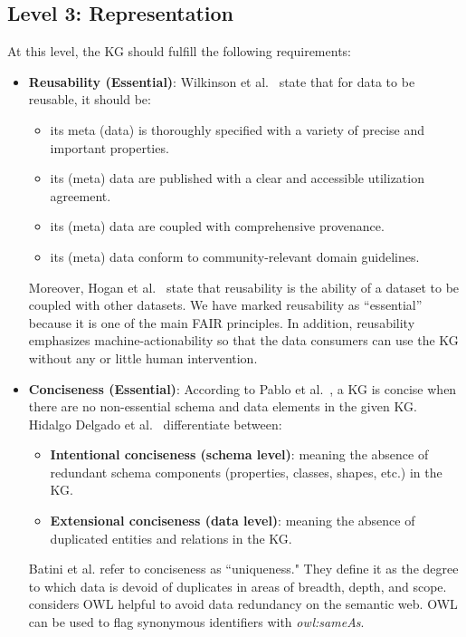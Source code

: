 \documentclass[runningheads]{llncs}
\begin{document}
\subsection{Level 3: Representation}
At this level, the KG should fulfill the following requirements:
\begin{itemize}
\item \textbf {Reusability (Essential)}:
\label{subsec:reusability}
Wilkinson et al.~\cite{Wilkinson2016} state that for data to be reusable, it should be:
\begin{itemize}
\item its meta (data) is thoroughly specified with a variety of precise and important properties.
\item its (meta) data are published with a clear and accessible utilization agreement.
\item its (meta) data are coupled with comprehensive provenance.
\item its (meta) data conform to community-relevant domain guidelines.
\end{itemize}
Moreover, Hogan et al.~\cite{hogan_knowledge_2022} state that reusability is the ability of a dataset to be coupled with other datasets. 
We have marked reusability as ``essential” because it is one of the main FAIR principles.
In addition, reusability emphasizes machine-actionability so that the data consumers can use the KG without any or little human intervention.
\item \textbf {Conciseness (Essential)}: 
According to Pablo et al.~\cite{Mendes2012SieveLD}, a KG is concise when there are no non-essential schema and data elements in the given KG.
Hidalgo Delgado et al.~\cite{Hidalgo-Delgado_quality_2021} differentiate between:
\begin{itemize}
\item \textbf{Intentional conciseness (schema level)}: meaning the absence of redundant schema components (properties, classes, shapes, etc.) in the KG.
\item \textbf{Extensional conciseness (data level)}: meaning the absence of duplicated entities and relations in the KG.
\end{itemize}
Batini et al.\cite{batini_methodologies_2009} refer to conciseness as ``uniqueness." They define it as the degree to which data is devoid of duplicates in areas of breadth, depth, and scope.
\cite{Frber2011SwiqaA} considers OWL helpful to avoid data redundancy on the semantic web. OWL can be used to flag synonymous identifiers with \textit{owl:sameAs}.

\end{itemize}
\end{document}
